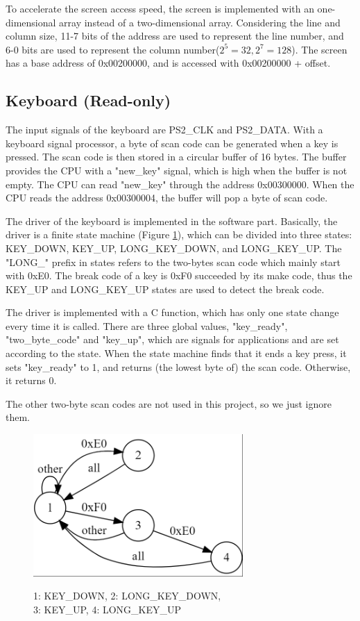 \documentclass[12pt, a4paper, oneside]{article}
\begin{document}
To accelerate the screen access speed, the screen is implemented with an one-dimensional array instead of a two-dimensional array. Considering the line and column size, 11-7 bits of the address are used to represent the line number, and 6-0 bits are used to represent the column number($2^5=32,2^7=128$). The screen has a base address of 0x00200000, and is accessed with 0x00200000 + offset.
\subsection{Keyboard (Read-only)}
The input signals of the keyboard are PS2\_CLK and PS2\_DATA. With a keyboard signal processor, a byte of scan code can be generated when a key is pressed. The scan code is then stored in a circular buffer of 16 bytes. The buffer provides the CPU with a "new\_key" signal, which is high when the buffer is not empty. The CPU can read "new\_key" through the address 0x00300000. When the CPU reads the address 0x00300004, the buffer will pop a byte of scan code.

The driver of the keyboard is implemented in the software part. Basically, the driver is a finite state machine (Figure \ref{fig:image1}), which can be divided into three states: KEY\_DOWN, KEY\_UP, LONG\_KEY\_DOWN, and LONG\_KEY\_UP. The "LONG\_" prefix in states refers to the two-bytes scan code which mainly start with 0xE0. The break code of a key is 0xF0 succeeded by its make code, thus the KEY\_UP and LONG\_KEY\_UP states are used to detect the break code.

The driver is implemented with a C function, which has only one state change every time it is called. There are three global values, "key\_ready", "two\_byte\_code" and "key\_up", which are signals for applications and are set according to the state. When the state machine finds that it ends a key press, it sets "key\_ready" to 1, and returns (the lowest byte of) the scan code. Otherwise, it returns 0.

The other two-byte scan codes are not used in this project, so we just ignore them.

\begin{figure}[!htb]
    \centering
    \includegraphics[width=8cm]{image1.png}
    \par 1: KEY\_DOWN, 2: LONG\_KEY\_DOWN, \\ 3: KEY\_UP, 4: LONG\_KEY\_UP
    \label{fig:image1}

\end{figure}
\end{document}
